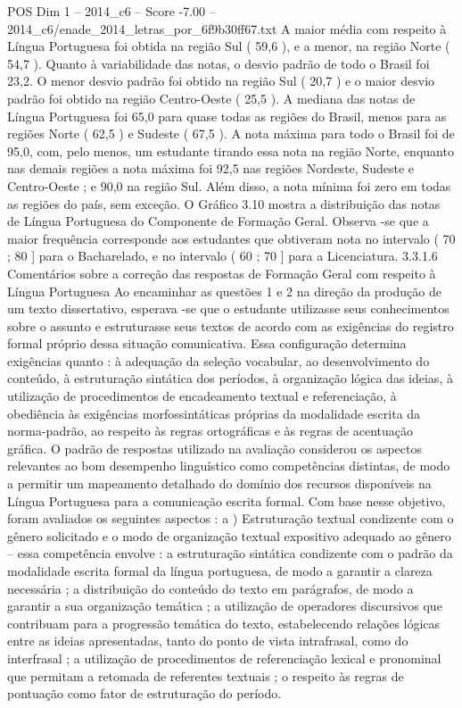 \begin{textsample}{POS Dim 1 – 2014\_c6 – Score -7.00 – 2014\_c6/enade\_2014\_letras\_por\_6f9b30ff67.txt}
A maior média com respeito à Língua Portuguesa foi obtida na região Sul ( 59,6 ), e a menor, na região Norte ( 54,7 ).
Quanto à variabilidade das notas, o desvio padrão de todo o Brasil foi 23,2.
O menor desvio padrão foi obtido na região Sul ( 20,7 ) e o maior desvio padrão foi obtido na região Centro-Oeste ( 25,5 ).
A mediana das notas de Língua Portuguesa foi 65,0 para quase todas as regiões do Brasil, menos para as regiões Norte ( 62,5 ) e Sudeste ( 67,5 ).
A nota máxima para todo o Brasil foi de 95,0, com, pelo menos, um estudante tirando essa nota na região Norte, enquanto nas demais regiões a nota máxima foi 92,5 nas regiões Nordeste, Sudeste e Centro-Oeste ; e 90,0 na região Sul.
Além disso, a nota mínima foi zero em todas as regiões do país, sem exceção.
O Gráfico 3.10 mostra a distribuição das notas de Língua Portuguesa do Componente de Formação Geral.
Observa -se que a maior frequência corresponde aos estudantes que obtiveram nota no intervalo ( 70 ; 80 ] para o Bacharelado, e no intervalo ( 60 ; 70 ] para a Licenciatura. 3.3.1.6 Comentários sobre a correção das respostas de Formação Geral com respeito à Língua Portuguesa Ao encaminhar as questões 1 e 2 na direção da produção de um texto dissertativo, esperava -se que o estudante utilizasse seus conhecimentos sobre o assunto e estruturasse seus textos de acordo com as exigências do registro formal próprio dessa situação comunicativa.
Essa configuração determina exigências quanto : à adequação da seleção vocabular, ao desenvolvimento do conteúdo, à estruturação sintática dos períodos, à organização lógica das ideias, à utilização de procedimentos de encadeamento textual e referenciação, à obediência às exigências morfossintáticas próprias da modalidade escrita da norma-padrão, ao respeito às regras ortográficas e às regras de acentuação gráfica.
O padrão de respostas utilizado na avaliação considerou os aspectos relevantes ao bom desempenho linguístico como competências distintas, de modo a permitir um mapeamento detalhado do domínio dos recursos disponíveis na Língua Portuguesa para a comunicação escrita formal.
Com base nesse objetivo, foram avaliados os seguintes aspectos : a ) Estruturação textual condizente com o gênero solicitado e o modo de organização textual expositivo adequado ao gênero – essa competência envolve : a estruturação sintática condizente com o padrão da modalidade escrita formal da língua portuguesa, de modo a garantir a clareza necessária ; a distribuição do conteúdo do texto em parágrafos, de modo a garantir a sua organização temática ; a utilização de operadores discursivos que contribuam para a progressão temática do texto, estabelecendo relações lógicas entre as ideias apresentadas, tanto do ponto de vista intrafrasal, como do interfrasal ; a utilização de procedimentos de referenciação lexical e pronominal que permitam a retomada de referentes textuais ; o respeito às regras de pontuação como fator de estruturação do período.

\end{textsample}
